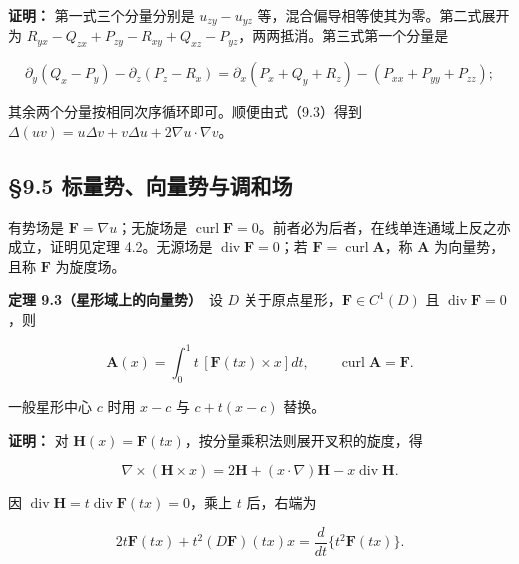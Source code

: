 \documentclass[11pt,a4paper]{article}
\begin{document}
\textbf{证明：} 第一式三个分量分别是 \(u_{zy}-u_{yz}\)
等，混合偏导相等使其为零。第二式展开为
\(R_{yx}-Q_{zx}+P_{zy}-R_{xy}+Q_{xz}-P_{yz}\)，两两抵消。第三式第一个分量是

\begin{equation*}
 \partial_y(Q_x-P_y)-\partial_z(P_z-R_x)
 =\partial_x(P_x+Q_y+R_z)-(P_{xx}+P_{yy}+P_{zz});
\end{equation*}

其余两个分量按相同次序循环即可。顺便由式（9.3）得到
\(\Delta(uv)=u\Delta v+v\Delta u+2\nabla u\cdot\nabla v\)。

\subsection{§9.5
标量势、向量势与调和场}\label{ux6807ux91cfux52bfux5411ux91cfux52bfux4e0eux8c03ux548cux573a}

有势场是 \(\mathbf F=\nabla u\)；无旋场是
\(\operatorname{curl}\mathbf F=0\)。前者必为后者，在线单连通域上反之亦成立，证明见定理
4.2。无源场是 \(\operatorname{div}\mathbf F=0\)；若
\(\mathbf F=\operatorname{curl}\mathbf A\)，称 \(\mathbf A\)
为向量势，且称 \(\mathbf F\) 为旋度场。

\textbf{定理 9.3（星形域上的向量势）}　设 \(D\)
关于原点星形，\(\mathbf F\in C^1(D)\) 且
\(\operatorname{div}\mathbf F=0\)，则

\begin{equation*}
 \mathbf A(x)=\int_0^1t\,[\mathbf F(tx)\times x]dt,
 \qquad\operatorname{curl}\mathbf A=\mathbf F.\tag{9.5}
\end{equation*}

一般星形中心 \(c\) 时用 \(x-c\) 与 \(c+t(x-c)\) 替换。

\textbf{证明：} 对
\(\mathbf H(x)=\mathbf F(tx)\)，按分量乘积法则展开叉积的旋度，得

\begin{equation*}
 \nabla\times(\mathbf H\times x)
 =2\mathbf H+(x\cdot\nabla)\mathbf H-x\operatorname{div}\mathbf H.
\end{equation*}

因
\(\operatorname{div}\mathbf H=t\operatorname{div}\mathbf F(tx)=0\)，乘上
\(t\) 后，右端为

\begin{equation*}
 2t\mathbf F(tx)+t^2(D\mathbf F)(tx)x
 =\frac d{dt}\{t^2\mathbf F(tx)\}.
\end{equation*}
\end{document}
